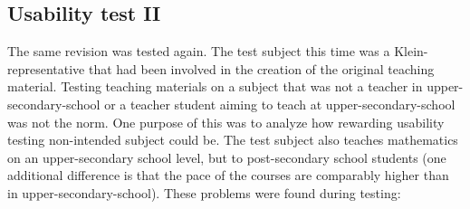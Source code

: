 \subsection{Usability test II}
The same revision was tested again. The test subject this time was a Klein-representative that had been involved in the creation of the original teaching material. Testing teaching materials on a subject that was not a teacher in upper-secondary-school or a teacher student aiming to teach at upper-secondary-school was not the norm. One purpose of this was to analyze how rewarding usability testing non-intended subject could be. The test subject also teaches mathematics on an upper-secondary school level, but to post-secondary school students (one additional difference is that the pace of the courses are comparably higher than in upper-secondary-school). These problems were found during testing:
